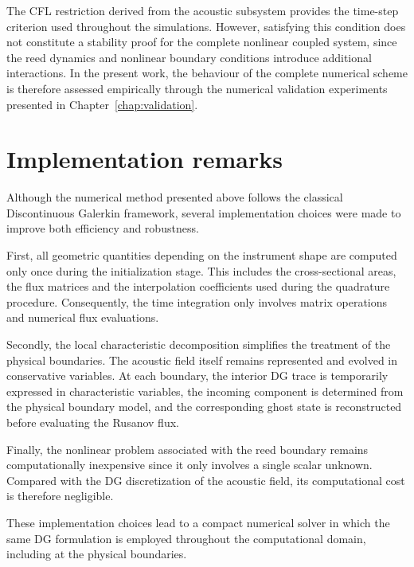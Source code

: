 \documentclass[11pt,a4paper]{report}
\theoremstyle{plain}
\theoremstyle{definition}
\begin{document}
The CFL restriction derived from the acoustic subsystem provides the time-step
criterion used throughout the simulations. However, satisfying this condition
does not constitute a stability proof for the complete nonlinear coupled
system, since the reed dynamics and nonlinear boundary conditions introduce
additional interactions. In the present work, the behaviour of the complete
numerical scheme is therefore assessed empirically through the numerical
validation experiments presented in Chapter~\ref{chap:validation}.

\section{Implementation remarks}

Although the numerical method presented above follows the classical
Discontinuous Galerkin framework, several implementation choices were made to
improve both efficiency and robustness.

First, all geometric quantities depending on the instrument shape are computed
only once during the initialization stage. This includes the cross-sectional
areas, the flux matrices and the interpolation coefficients used during the
quadrature procedure. Consequently, the time integration only involves matrix
operations and numerical flux evaluations.

Secondly, the local characteristic decomposition simplifies the treatment of
the physical boundaries. The acoustic field itself remains represented and
evolved in conservative variables. At each boundary, the interior DG trace is
temporarily expressed in characteristic variables, the incoming component is
determined from the physical boundary model, and the corresponding ghost state
is reconstructed before evaluating the Rusanov flux.

Finally, the nonlinear problem associated with the reed boundary remains
computationally inexpensive since it only involves a single scalar unknown.
Compared with the DG discretization of the acoustic field, its computational
cost is therefore negligible.

These implementation choices lead to a compact numerical solver in which the
same DG formulation is employed throughout the computational domain, including
at the physical boundaries.

\end{document}

